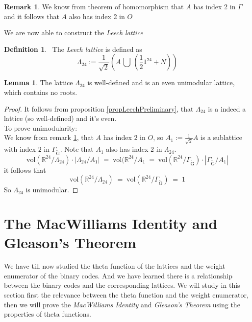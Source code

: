 \documentclass[12pt]{article}
\theoremstyle{definition}
\newtheorem{lemma}[theorem]{Lemma}
\newtheorem{definition}[theorem]{Definition}
\newtheorem{remark}[theorem]{Remark}
\numberwithin{equation}{theorem}
\numberwithin{figure}{theorem}
\newcommand{\cCodes}{\ensuremath{\widetilde{\mathrm{G}}}}
\newcommand{\buildLattice}[1]{\ensuremath{\Gamma_{#1}}}
\newcommand{\wt}[1]{\ensuremath{\text{wt}(#1)}}
\newcommand{\Real}{\ensuremath{\mathbb{R}}}
\begin{document}
\begin{remark}\label{remarkLeechPreli}
We know from theorem of homomorphism that $A$ has index 2 in $\Gamma$ and it follows that $A$ also has index 2 in $O$
\end{remark}
We are now able to construct the \emph{Leech lattice}
\begin{definition}\label{defLeech}\
The \emph{Leech lattice} is defined as
	\[
		\Lambda_{24} := \frac{1}{\sqrt{2}} \left( A \, \bigcup \,(\frac{1}{2}1^{24} + N) \right)
	\]
\end{definition}
\begin{lemma}\label{lemmaLeech}
The lattice $\Lambda_{24}$ is well-defined and is an even unimodular lattice, which contains no roots.
\end{lemma}
\begin{proof}
It follows from proposition \ref{propLeechPreliminary}, that $\Lambda_{24}$ is a indeed a lattice (so well-defined) and it's even.\\
To prove unimodularity:\\
We know from remark \ref{remarkLeechPreli}, that $A$ has index $2$ in $O$, so $A_1 := \frac{1}{\sqrt{2}}A$ is a sublattice with index $2$ in $\buildLattice{\cCodes}$. Note that $A_1$ also has index $2$ in $\Lambda_{24}$.
\[
	\text{vol}(\Real^{24}/{\Lambda_{24}}) \cdot |\Lambda_{24}/A_1| \;=\; \text{vol}(\Real^{24}/A_1 \;=\; \text{vol}(\Real^{24}/\buildLattice{\cCodes}) \cdot |\buildLattice{\cCodes}/A_1|
\]
it follows that 
\[
	\text{vol}(\Real^{24}/{\Lambda_{24}}) \; = \; \text{vol}(\Real^{24}/\buildLattice{\cCodes}) \; = \; 1
\]
So $\Lambda_{24}$ is unimodular.
\end{proof}

\section{The MacWilliams Identity and Gleason's Theorem}\label{sectionMacWill}
We have till now studied the theta function of the lattices and the weight enumerator of the binary codes. And we have learned there is a relationship between the binary codes and the corresponding lattices. We will study in this section first the relevance between the theta function and the weight enumerator, then we will prove the \emph{MacWilliams Identity} and \emph{Gleason's Theorem} using the properties of theta functions.\\
\end{document}
